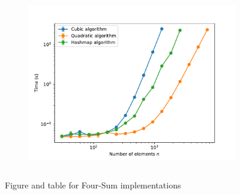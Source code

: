 \documentclass[12pt, a4paper]{article}
\begin{document}
\begin{figure}[H]
  \begin{subfigure}{0.58\textwidth} 
    \includegraphics[width=\textwidth]{four_sum.pdf}
    \label{fig:fourruntimes}
  \end{subfigure}
  \hfill
  \begin{subfigure}{0.40\textwidth}
    \begin{adjustbox}{max width=\textwidth}
      \begin{tabular}{|c|c|c|c|}
        
      \end{tabular}
    \end{adjustbox}
    \label{tbl:four_average}
  \end{subfigure}
  \caption{Figure and table for Four-Sum implementations}
  \label{foursumTableFigure}
\end{figure}
\end{document}
